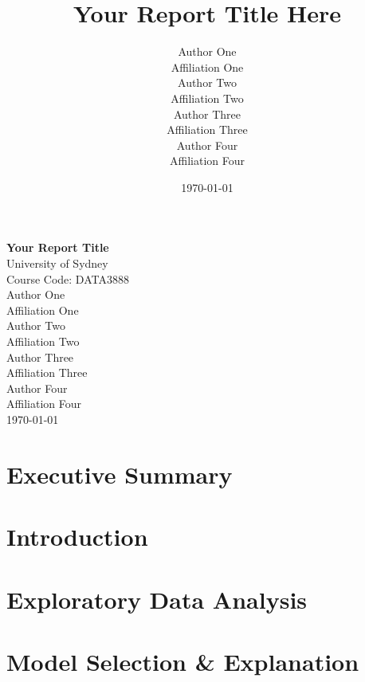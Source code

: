 \documentclass[12pt,a4paper,titlepage]{article}
\title{Your Report Title Here}
\author{
  Author One\\
  \small Affiliation One\\[1ex]
  Author Two\\
  \small Affiliation Two\\[1ex]
  Author Three\\
  \small Affiliation Three\\[1ex]
  Author Four\\
  \small Affiliation Four
}
\date{\today}
\begin{document}
\begin{titlepage}
  \vspace*{\fill}
  \centering
  {\Huge\bfseries Your Report Title}\\[1cm]
  {\Large University of Sydney}\\[0.5cm]
  {\Large Course Code: DATA3888}\\[1.5cm]

  {\large
    Author One\\
    \small Affiliation One\\[1ex]
    Author Two\\
    \small Affiliation Two\\[1ex]
    Author Three\\
    \small Affiliation Three\\[1ex]
    Author Four\\
    \small Affiliation Four
  }\\[2cm]

  {\large \today}
  \vspace*{\fill}
\end{titlepage}
\newpage

\tableofcontents
\newpage

\section*{Executive Summary}

\section*{Introduction}

\section*{Exploratory Data Analysis}

\section*{Model Selection \& Explanation}
\end{document}
